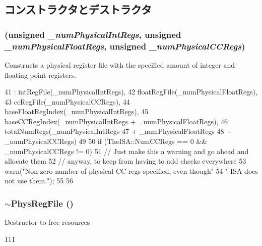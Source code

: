 \subsection{コンストラクタとデストラクタ}
\hypertarget{classPhysRegFile_acbcbe09a90b7a6c7c8f65e741567e6e6}{
\subsubsection[{PhysRegFile}]{ (unsigned {\em \_\-numPhysicalIntRegs}, \/  unsigned {\em \_\-numPhysicalFloatRegs}, \/  unsigned {\em \_\-numPhysicalCCRegs})}}
\label{classPhysRegFile_acbcbe09a90b7a6c7c8f65e741567e6e6}
Constructs a physical register file with the specified amount of integer and floating point registers. 


\begin{DoxyCode}
41     : intRegFile(_numPhysicalIntRegs),
42       floatRegFile(_numPhysicalFloatRegs),
43       ccRegFile(_numPhysicalCCRegs),
44       baseFloatRegIndex(_numPhysicalIntRegs),
45       baseCCRegIndex(_numPhysicalIntRegs + _numPhysicalFloatRegs),
46       totalNumRegs(_numPhysicalIntRegs
47                    + _numPhysicalFloatRegs
48                    + _numPhysicalCCRegs)
49 {
50     if (TheISA::NumCCRegs == 0 && _numPhysicalCCRegs != 0) {
51         // Just make this a warning and go ahead and allocate them
52         // anyway, to keep from having to add checks everywhere
53         warn("Non-zero number of physical CC regs specified, even though\n"
54              "    ISA does not use them.\n");
55     }
56 }
\end{DoxyCode}
\hypertarget{classPhysRegFile_a0575415d268018e7c2b476a953efd066}{
\subsubsection[{$\sim$PhysRegFile}]{\setlength{\rightskip}{0pt plus 5cm}$\sim${\bf PhysRegFile} ()}}
\label{classPhysRegFile_a0575415d268018e7c2b476a953efd066}
Destructor to free resources 


\begin{DoxyCode}
111 {}
\end{DoxyCode}


